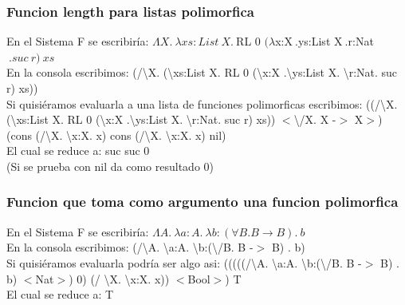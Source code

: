 \documentclass[12pt, titlepage, a4paper]{article}
\begin{document}
\subsubsection{Funcion length para listas polimorfica}
\noindent En el Sistema F se escribiría: $\Lambda X.\ \lambda xs:List \ X. \ $RL 0 $(\lambda $x:X$ \ .$ys:List X$ \ .$r:Nat$\ .suc\ r)\ xs$ \\
En la consola escribimos: (/\textbackslash X. (\textbackslash xs:List X. RL 0 (\textbackslash x:X .\textbackslash ys:List X. \textbackslash r:Nat. suc r) xs)) \\
Si quisiéramos evaluarla a una lista de funciones polimorficas escribimos: 
((/\textbackslash X. (\textbackslash xs:List X. RL 0 (\textbackslash x:X .\textbackslash ys:List X. \textbackslash r:Nat. suc r) xs)) $<$\textbackslash/X. X -$>$ X$>$) 
(cons (/\textbackslash X. \textbackslash x:X. x) cons (/\textbackslash X. \textbackslash x:X. x) nil)\\
El cual se reduce a: suc suc 0 \\

\noindent (Si se prueba con nil da como resultado 0)

\subsubsection{Funcion que toma como argumento una funcion polimorfica}
\noindent En el Sistema F se escribiría: $\Lambda A.\ \lambda a:A.\ \lambda b:(\forall B. B \rightarrow  B). \ b$ \\
En la consola escribimos: (/\textbackslash A. \textbackslash a:A. \textbackslash b:(\textbackslash /B. B -$>$ B) . b)\\
Si quisiéramos evaluarla podría ser algo asi: (((((/\textbackslash A. \textbackslash a:A. \textbackslash b:(\textbackslash /B. B -$>$ B) . b) $<$Nat$>$) 0) (/ \textbackslash X. \textbackslash x:X. x)) $<$Bool$>$) T\\
El cual se reduce a: T

\newpage



\end{document}

